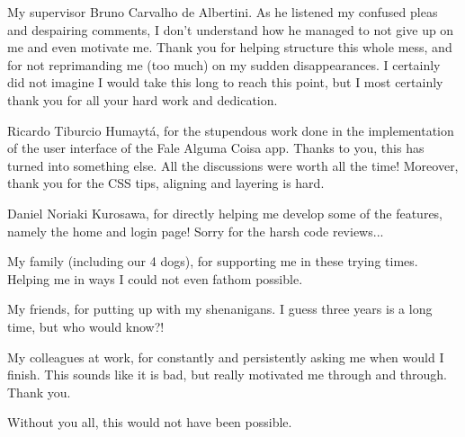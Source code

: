 \documentclass[
	12pt,				%
	openright,			%
	oneside,			%
	a4paper,			%
	hyphens,			%
	english,			%
	english				%
]{abntex2}
\begin{document}

	\frenchspacing

	\pretextual

	\imprimircapa

	\imprimirfolhaderosto*
	
    \dedicatoria{
    
    }
    
    
    \begin{agradecimentos}
    My supervisor Bruno Carvalho de Albertini. As he listened my confused pleas and despairing comments, I don't understand how he managed to not give up on me and even motivate me. Thank you for helping structure this whole mess, and for not reprimanding me (too much) on my sudden disappearances. I certainly did not imagine I would take this long to reach this point, but I most certainly thank you for all your hard work and dedication.

    Ricardo Tiburcio Humaytá, for the stupendous work done in the implementation of the user interface of the Fale Alguma Coisa app. Thanks to you, this has turned into something else. All the discussions were worth all the time! Moreover, thank you for the CSS tips, aligning and layering is hard.
    
    Daniel Noriaki Kurosawa, for directly helping me develop some of the features, namely the home and login page! Sorry for the harsh code reviews...

    My family (including our 4 dogs), for supporting me in these trying times. Helping me in ways I could not even fathom possible.
    
    My friends, for putting up with my shenanigans. I guess three years is a long time, but who would know?!
    
    My colleagues at work, for constantly and persistently asking me when would I finish. This sounds like it is bad, but really motivated me through and through. Thank you.

    Without you all, this would not have been possible.
    \end{agradecimentos}
    
\end{document}
